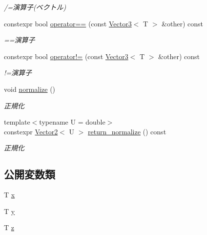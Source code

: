 \begin{DoxyCompactItemize}
\begin{DoxyCompactList}\small\item\em /=演算子(ベクトル) \end{DoxyCompactList}\item 
constexpr bool \mbox{\hyperlink{classsaki_1_1_vector3_ad03a150d0fa01d9a673081cb0ceb150e}{operator==}} (const \mbox{\hyperlink{classsaki_1_1_vector3}{Vector3}}$<$ T $>$ \&other) const
\begin{DoxyCompactList}\small\item\em ==演算子 \end{DoxyCompactList}\item 
constexpr bool \mbox{\hyperlink{classsaki_1_1_vector3_aaaf161e4fc7f76aeee0d074efd411748}{operator!=}} (const \mbox{\hyperlink{classsaki_1_1_vector3}{Vector3}}$<$ T $>$ \&other) const
\begin{DoxyCompactList}\small\item\em !=演算子 \end{DoxyCompactList}\item 
void \mbox{\hyperlink{classsaki_1_1_vector3_a7b9496274bab6ea6147e6a09e1493110}{normalize}} ()
\begin{DoxyCompactList}\small\item\em 正規化 \end{DoxyCompactList}\item 
{\footnotesize template$<$typename U  = double$>$ }\\constexpr \mbox{\hyperlink{classsaki_1_1_vector2}{Vector2}}$<$ U $>$ \mbox{\hyperlink{classsaki_1_1_vector3_ab4bbc1a8a3cbf860996a5136b3c1536f}{return\+\_\+normalize}} () const
\begin{DoxyCompactList}\small\item\em 正規化 \end{DoxyCompactList}\end{DoxyCompactItemize}
\subsection*{公開変数類}
\begin{DoxyCompactItemize}
\item 
T \mbox{\hyperlink{classsaki_1_1_vector3_a1fa58e9e75dbeb650afb3db740f3131c}{x}}
\item 
T \mbox{\hyperlink{classsaki_1_1_vector3_aba41be4543769bd023387691acf654dd}{y}}
\item 
T \mbox{\hyperlink{classsaki_1_1_vector3_abb4ddf92f66d05e965fbd17ab3e655ff}{z}}
\end{DoxyCompactItemize}


